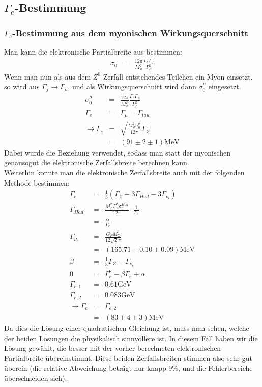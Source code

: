 \subsection{$\Gamma_e$-Bestimmung}
\subsubsection{$\Gamma_e$-Bestimmung aus dem myonischen Wirkungsquerschnitt}
Man kann die elektronische Partialbreite aus \cite[Gl.5]{script} bestimmen:
\begin{eqnarray}
 \sigma_0 &=& \frac{12\pi}{M_Z^2}\frac{\Gamma_e\Gamma_f}{\Gamma_Z^2}
\end{eqnarray}
Wenn man nun als aus dem $Z^0$-Zerfall entstehendes Teilchen ein Myon einsetzt, so wird aus $\Gamma_f\rightarrow\Gamma_{\mu}$, und als Wirkungsquerschnitt wird dann $\sigma_0^{\mu}$ eingesetzt.
\begin{eqnarray}
\sigma_0^{\mu} &=& \frac{12\pi}{M_Z^2}\frac{\Gamma_e\Gamma_{\mu}}{\Gamma_Z^2}\\
 \Gamma_e &=& \Gamma_{\mu} = \Gamma_{tau}\\
 \rightarrow \Gamma_e &=& \sqrt{\frac{M_Z^2\sigma_0^{\mu}}{12\pi}}\Gamma_Z\\
 &=& (91 \pm 2 \pm 1)\si{\mega\electronvolt}
\end{eqnarray}
Dabei wurde die Beziehung \cite[Gl.9]{script} verwendet, sodass man statt der myonischen genausogut die elektronische Zerfallsbreite berechnen kann.\\
Weiterhin konnte man die elektronische Zerfallsbreite auch mit der folgenden Methode bestimmen:
\begin{eqnarray}
\Gamma_e &=& \frac{1}{3}(\Gamma_Z - 3\Gamma_{Had} - 3\Gamma_{\nu_l})\\
\Gamma_{Had} &=& \frac{M_Z^2\Gamma_Z^2\sigma_0^{Had}}{12\pi}\cdot\frac{1}{\Gamma_e}\\
&=& \frac{\alpha}{\Gamma_e}\\
\Gamma_{\nu_e} &=& \frac{G_FM_Z^3}{12\sqrt{2}\pi}\\
&=& (165.71 \pm 0.10 \pm 0.09)\si{\mega\electronvolt}\\
\beta &=& \frac{1}{3}\Gamma_Z - \Gamma_{\nu_e}\\
0 &=& \Gamma_e^2 - \beta\Gamma_e + \alpha\\
\Gamma_{e,1} &=& 0.61\si{\giga\electronvolt}\\
\Gamma_{e,2} &=& 0.083\si{\giga\electronvolt}\\
\rightarrow \Gamma_e &=& \Gamma_{e,2}\\
&=& (83 \pm 4 \pm 3) \si{\mega\electronvolt}
\end{eqnarray}
Da dies die Lösung einer quadratischen Gleichung ist, muss man sehen, welche der beiden Lösungen die physikalisch sinnvollere ist. In diesem Fall haben wir die Lösung gewählt, die besser mit der vorher berechneten elektronischen Partialbreite übereinstimmt. Diese beiden Zerfallsbreiten stimmen also sehr gut überein (die relative Abweichung beträgt nur knapp 9\si{\percent}, und die Fehlerbereiche überschneiden sich).

